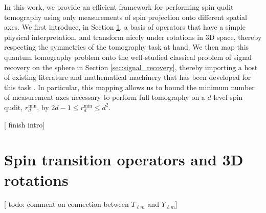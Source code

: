 \documentclass[notitlepage,twocolumn]{revtex4-2}
\renewcommand{\t}{\text} %
\newcommand{\1}{\mathds{1}}
\newcommand{\red}[1]{{\color{red} #1}}
\begin{document}
In this work, we provide an efficient framework for performing spin qudit tomography using only measurements of spin projection onto different spatial axes.
We first introduce, in Section \ref{sec:transition_ops}, a basis of operators that have a simple physical interpretation, and transform nicely under rotations in 3D space, thereby respecting the symmetries of the tomography task at hand.
We then map this quantum tomography problem onto the well-studied classical problem of signal recovery on the sphere in Section \ref{sec:signal_recovery}, thereby importing a host of existing literature and mathematical machinery that has been developed for this task \cite{mcewen2011novel, rauhut2011sparse, alem2012sparse, khalid2014optimaldimensionality}.
In particular, this mapping allows us to bound the minimum number of measurement axes necessary to perform full tomography on a $d$-level spin qudit, $r_d^{\t{min}}$, by $2d-1\le r_d^{\t{min}}\le d^2$.

[\red{finish intro}]

\section{Spin transition operators and 3D rotations}
\label{sec:transition_ops}

[\red{todo: comment on connection between $T_{\ell m}$ and $Y_{\ell m}$}]
\end{document}
